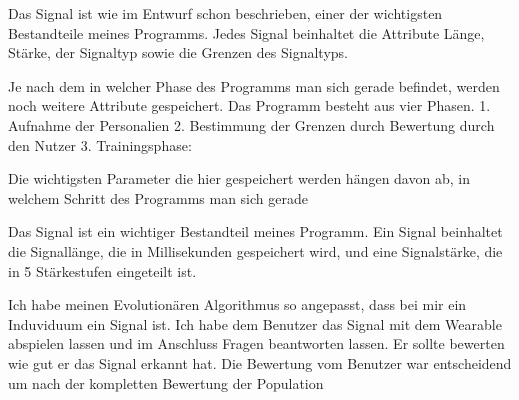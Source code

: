 
Das Signal ist wie im Entwurf schon beschrieben, einer der wichtigsten Bestandteile meines Programms. 
Jedes Signal beinhaltet die Attribute Länge, Stärke, der Signaltyp sowie die Grenzen des Signaltyps.

Je nach dem in welcher Phase des Programms man sich gerade befindet, werden noch weitere Attribute gespeichert.
Das Programm besteht aus vier Phasen.
1. Aufnahme der Personalien
2. Bestimmung der Grenzen durch Bewertung durch den Nutzer
3. Trainingsphase: 

Die wichtigsten Parameter die hier gespeichert werden hängen davon ab, in welchem Schritt des Programms man sich gerade 

Das Signal ist ein wichtiger Bestandteil meines Programm. 
Ein Signal beinhaltet die Signall{\"a}nge, die in Millisekunden gespeichert wird, und eine Signalst{\"a}rke, die in 5 St{\"a}rkestufen eingeteilt ist. 



Ich habe meinen Evolution{\"a}ren Algorithmus so angepasst, dass bei mir ein Induviduum ein Signal ist. 
Ich habe dem Benutzer das Signal mit dem Wearable abspielen lassen und im Anschluss Fragen beantworten lassen. 
Er sollte bewerten wie gut er das Signal erkannt hat. Die Bewertung vom Benutzer war entscheidend um nach der kompletten Bewertung der Population 

